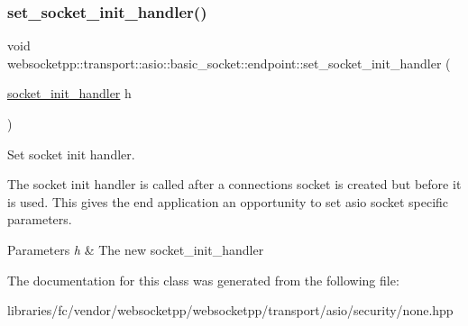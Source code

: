 \subsubsection{\texorpdfstring{set\+\_\+socket\+\_\+init\+\_\+handler()}{set\_socket\_init\_handler()}}
{\footnotesize\ttfamily void websocketpp\+::transport\+::asio\+::basic\+\_\+socket\+::endpoint\+::set\+\_\+socket\+\_\+init\+\_\+handler (\begin{DoxyParamCaption}\item[{\mbox{\hyperlink{namespacewebsocketpp_1_1transport_1_1asio_1_1basic__socket_a88f9c59fa40db3188769162db98edb93}{socket\+\_\+init\+\_\+handler}}}]{h }\end{DoxyParamCaption})\hspace{0.3cm}{\ttfamily [inline]}}



Set socket init handler. 

The socket init handler is called after a connection\textquotesingle{}s socket is created but before it is used. This gives the end application an opportunity to set asio socket specific parameters.


\begin{DoxyParams}{Parameters}
{\em h} & The new socket\+\_\+init\+\_\+handler \\
\hline
\end{DoxyParams}


The documentation for this class was generated from the following file\+:\begin{DoxyCompactItemize}
\item 
libraries/fc/vendor/websocketpp/websocketpp/transport/asio/security/none.\+hpp\end{DoxyCompactItemize}
